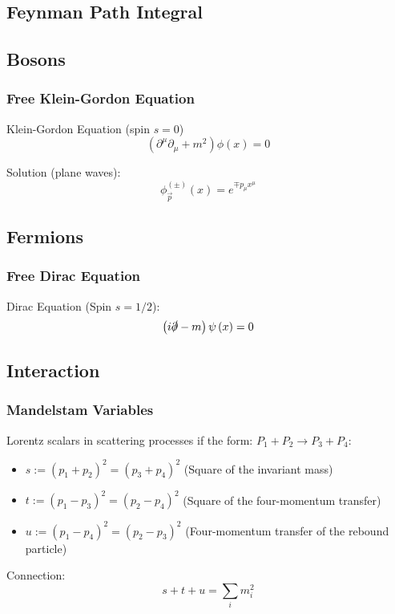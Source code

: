 	\subsection{Feynman Path Integral}

	\subsection{Bosons}
		\subsubsection{Free Klein-Gordon Equation}
			\noindent
			Klein-Gordon Equation (spin $s=0$)
			\begin{equation}
				\left(\partial^\mu\partial_\mu+m^2\right) \phi(x) = 0
			\end{equation}

			\noindent
			Solution (plane waves):
			\begin{equation}
				{\phi}^{ ( \pm ) }_{\vec{p}} (x) = e^{\mp p_\mu x^\mu}
			\end{equation}

	\subsection{Fermions}
		\subsubsection{Free Dirac Equation}
			\noindent
			Dirac Equation (Spin $s=1/2$):
			\begin{equation}
				\left(  i\slashed{\partial} - m  \right) \psi\left( x \right) = 0
			\end{equation}

	\subsection{Interaction}
		\subsubsection{Mandelstam Variables}
			\noindent
			Lorentz scalars in scattering processes if the form: $P_1 + P_2 \rightarrow P_3 + P_4$:
			\begin{itemize}\itemsep -0pt	%
				\item $s:=(p_1+p_2)^2=(p_3+p_4)^2$ \hfill{(Square of the invariant mass)}
				\item $t:=(p_1-p_3)^2=(p_2-p_4)^2$ \hfill{(Square of the four-momentum transfer)}
				\item $u:=(p_1-p_4)^2=(p_2-p_3)^2$ \hfill{(Four-momentum transfer of the rebound particle)}
			\end{itemize}

			\noindent
			Connection:
			\begin{equation}
				s+t+u = \sum_i m_i^2
			\end{equation}
